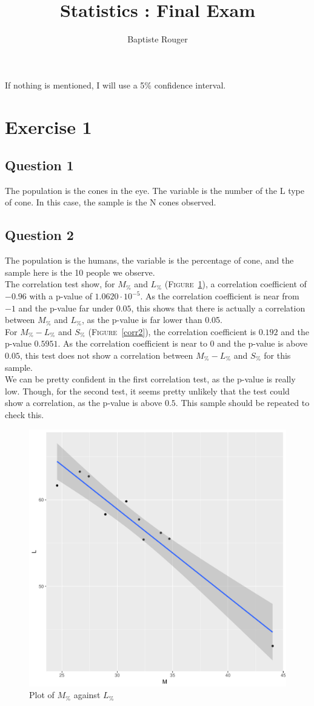 \documentclass[12pt,a4paper]{article}
\author{Baptiste Rouger}
\title{Statistics : Final Exam}
\begin{document}
\maketitle

If nothing is mentioned, I will use a 5\% confidence interval.
\section*{Exercise 1}
\subsection*{Question 1}
The population is the cones in the eye. The variable is the number of the L type of cone. In this case, the sample is the N cones observed.

\subsection*{Question 2}
The population is the humans, the variable is the percentage of cone, and the sample here is the 10 people we observe.\\
The correlation test show, for $M_\%$ and $L_\%$ (\textsc{Figure}~\ref{corr1}), a correlation coefficient of $-0.96$ with a p-value of $1.0620\cdot 10^{-5}$. As the correlation coefficient is near from $-1$ and the p-value far under $0.05$, this shows that there is actually a correlation between $M_\%$ and $L_\%$, as the p-value is far lower than 0.05.\\
For $M_\% - L_\%$ and $S_\%$ (\textsc{Figure}~\ref{corr2}), the correlation coefficient is $0.192$ and the p-value $0.5951$. As the correlation coefficient is near to $0$ and the p-value is above $0.05$, this test does not show a correlation between $M_\% - L_\%$ and $S_\%$ for this sample.\\
We can be pretty confident in the first correlation test, as the p-value is really low. Though, for the second test, it seems pretty unlikely that the test could show a correlation, as the p-value is above $0.5$. This sample should be repeated to check this.
\begin{figure}
  \begin{center}
    \includegraphics[width=0.6\linewidth]{corr1.pdf}
    \caption{Plot of $M_\%$ against $L_\%$}
    \label{corr1}
  \end{center}
\end{figure}
\end{document}
